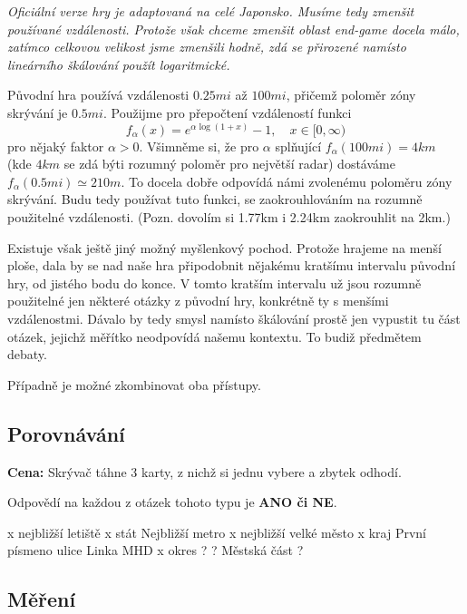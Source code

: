 \documentclass{book}
\newenvironment{reasoning}{\begin{small}\itshape}{\end{small}}
\begin{document}
\begin{reasoning}
	Oficiální verze hry je adaptovaná na celé Japonsko. Musíme tedy zmenšit používané vzdálenosti. Protože však chceme zmenšit oblast end-game docela málo, zatímco celkovou velikost jsme zmenšili hodně, zdá se přirozené namísto lineárního škálování použít logaritmické.

	Původní hra používá vzdálenosti $0.25mi$ až $100mi$, přičemž poloměr zóny skrývání je $0.5mi$. Použijme pro přepočtení vzdáleností funkci
	\begin{equation*}
		f_\alpha(x) = e^{\alpha\log(1+x)} - 1,\quad x \in [0, \infty)
	\end{equation*}
	pro nějaký faktor $\alpha > 0$. Všimněme si, že pro $\alpha$ splňující $f_\alpha(100mi) = 4km$ (kde $4km$ se zdá býti rozumný poloměr pro největší radar) dostáváme $f_\alpha(0.5mi) \simeq 210m$. To docela dobře odpovídá námi zvolenému poloměru zóny skrývání. Budu tedy používat tuto funkci, se zaokrouhlováním na rozumně použitelné vzdálenosti. (Pozn. dovolím si 1.77km i 2.24km zaokrouhlit na 2km.)

	Existuje však ještě jiný možný myšlenkový pochod. Protože hrajeme na menší ploše, dala by se nad naše hra připodobnit nějakému kratšímu intervalu původní hry, od jistého bodu do konce. V tomto kratším intervalu už jsou rozumně použitelné jen některé otázky z původní hry, konkrétně ty s menšími vzdálenostmi. Dávalo by tedy smysl namísto škálování prostě jen vypustit tu část otázek, jejichž měřítko neodpovídá našemu kontextu. To budiž předmětem debaty.

	Případně je možné zkombinovat oba přístupy.
\end{reasoning}

\subsection{Porovnávání}

\textbf{Cena:} Skrývač táhne 3 karty, z nichž si jednu vybere a zbytek odhodí.

Odpovědí na každou z otázek tohoto typu je \textbf{ANO či NE}.

x nejbližší letiště
x stát
Nejbližší metro
x nejbližší velké město
x kraj
První písmeno ulice
Linka MHD
x okres
?
?
Městská část
?


\subsection{Měření}
\end{document}
